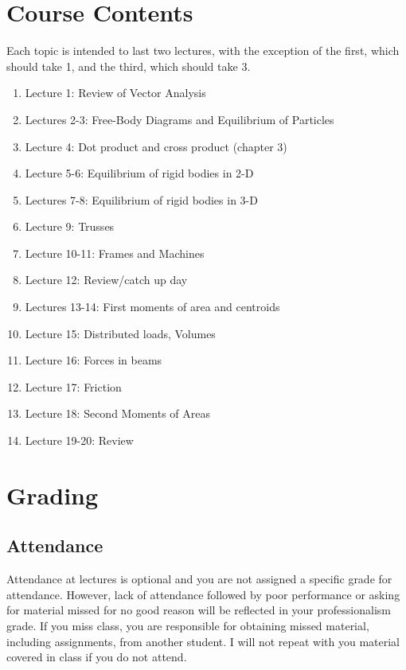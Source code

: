 \documentclass[10pt]{article}
\begin{document}
\section*{Course Contents}
Each topic is intended to last two lectures, with the exception of the first, which should take 1, and the third, which should take 3. 
\begin{enumerate}
\item Lecture 1: Review of Vector Analysis
\item Lectures 2-3: Free-Body Diagrams and Equilibrium of Particles
\item Lecture 4: Dot product and cross product (chapter 3)
\item Lecture 5-6: Equilibrium of rigid bodies in 2-D
\item Lectures 7-8: Equilibrium of rigid bodies in 3-D
\item Lecture  9: Trusses
\item Lecture 10-11: Frames and Machines
\item Lecture 12: Review/catch up day
\item Lectures 13-14: First moments of area and centroids
\item Lecture 15: Distributed loads, Volumes
\item Lecture 16: Forces in beams
\item Lecture 17: Friction
\item Lecture 18: Second Moments of Areas
\item Lecture 19-20: Review
\end{enumerate}

\section*{Grading}
\subsection*{Attendance}
Attendance at lectures is optional and you are not assigned a specific grade for attendance. However, lack of attendance followed by poor performance or asking for material missed for no good reason will be reflected in your professionalism grade. If you miss class, you are responsible for obtaining missed material, including assignments, from another student. I will not repeat with you material covered in class if you do not attend.
\end{document}
